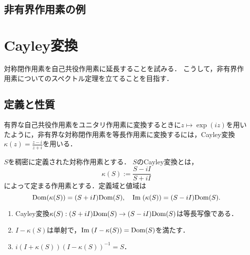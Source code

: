 \documentclass[uplatex,dvipdfmx]{jsreport}
\begin{document}
\subsection{非有界作用素の例}

\section{Cayley変換}

\begin{tcolorbox}[colframe=ForestGreen, colback=ForestGreen!10!white,breakable,colbacktitle=ForestGreen!40!white,coltitle=black,fonttitle=\bfseries\sffamily,
title=]
    対称閉作用素を自己共役作用素に延長することを試みる．
    こうして，非有界作用素についてのスペクトル定理を立てることを目指す．
\end{tcolorbox}

\subsection{定義と性質}

\begin{tcolorbox}[colframe=ForestGreen, colback=ForestGreen!10!white,breakable,colbacktitle=ForestGreen!40!white,coltitle=black,fonttitle=\bfseries\sffamily,
title=]
    有界な自己共役作用素をユニタリ作用素に変換するときに$z\mapsto\exp(iz)$を用いたように，非有界な対称閉作用素を等長作用素に変換するには，Cayley変換$\kappa(z)=\frac{z-i}{z+i}$を用いる．
\end{tcolorbox}

\begin{definition}
    $S$を稠密に定義された対称作用素とする．
    $S$のCayley変換とは，
    \[\kappa(S):=\frac{S-iI}{S+iI}\]
    によって定まる作用素とする．定義域と値域は
    \[\mathrm{Dom}(\kappa(S))=(S+iI)\mathrm{Dom}(S),\quad\mathrm{Im}\;(\kappa(S))=(S-iI)\mathrm{Dom}(S).\]
\end{definition}

\begin{lemma}\mbox{}
    \begin{enumerate}
        \item Cayley変換$\kappa(S):(S+iI)\mathrm{Dom}(S)\to(S-iI)\mathrm{Dom}(S)$は等長写像である．
        \item $I-\kappa(S)$は単射で，$\mathrm{Im}\;(I-\kappa(S))=\mathrm{Dom}(S)$を満たす．
        \item $i(I+\kappa(S))(I-\kappa(S))^{-1}=S$．
    \end{enumerate}
\end{lemma}
\end{document}
